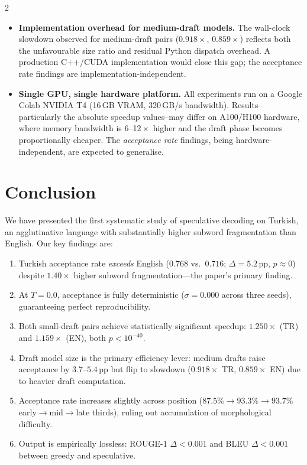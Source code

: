 \documentclass[11pt,a4paper]{article}
\begin{document}
\begin{multicols}{2}
\begin{itemize}[leftmargin=*]
  \item \textbf{Implementation overhead for medium-draft models.}
        The wall-clock slowdown observed for medium-draft pairs
        ($0.918\!\times$, $0.859\!\times$) reflects both the unfavourable
        size ratio and residual Python dispatch overhead.
        A production C++/CUDA implementation would close this gap;
        the acceptance rate findings are implementation-independent.

  \item \textbf{Single GPU, single hardware platform.}
        All experiments run on a Google Colab NVIDIA T4 (16\,GB VRAM,
        320\,GB/s bandwidth).
        Results--particularly the absolute speedup values--may differ on
        A100/H100 hardware, where memory bandwidth is 6--12$\!\times$
        higher and the draft phase becomes proportionally cheaper.
        The \emph{acceptance rate} findings, being hardware-independent,
        are expected to generalise.

\end{itemize}

\section{Conclusion}
\label{sec:conclusion}

We have presented the first systematic study of speculative decoding on
Turkish, an agglutinative language with substantially higher subword
fragmentation than English.
Our key findings are:

\begin{enumerate}[leftmargin=*]
  \item Turkish acceptance rate \emph{exceeds} English ($0.768$ vs.\
        $0.716$; $\Delta=5.2$\,pp, $p \approx 0$) despite $1.40\!\times$
        higher subword fragmentation—the paper's primary finding.
  \item At $T=0.0$, acceptance is fully deterministic ($\sigma=0.000$
        across three seeds), guaranteeing perfect reproducibility.
  \item Both small-draft pairs achieve statistically significant speedup:
        $1.250\!\times$ (TR) and $1.159\!\times$ (EN), both
        $p < 10^{-40}$.
  \item Draft model size is the primary efficiency lever: medium drafts
        raise acceptance by $3.7$--$5.4$\,pp but flip to slowdown
        ($0.918\!\times$ TR, $0.859\!\times$ EN) due to heavier
        draft computation.
  \item Acceptance rate increases slightly across position
        ($87.5\%\!\to\!93.3\%\!\to\!93.7\%$ early$\to$mid$\to$late
        thirds), ruling out accumulation of morphological difficulty.
  \item Output is empirically lossless: ROUGE-1 $\Delta < 0.001$
        and BLEU $\Delta < 0.001$ between greedy and speculative.
\end{enumerate}


\end{multicols}
\end{document}
